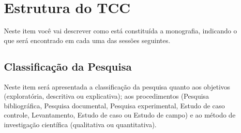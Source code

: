 \section{Estrutura do TCC}
Neste item você vai descrever como está constituída a monografia, indicando o
que será encontrado em cada uma das sessões seguintes.

\subsection{Classificação da Pesquisa}
Neste item será apresentada a classificação da pesquisa quanto aos objetivos
(exploratória, descritiva ou explicativa); aos procedimentos (Pesquisa
bibliográfica, Pesquisa documental, Pesquisa experimental, Estudo de caso
controle, Levantamento, Estudo de caso ou Estudo de campo) e ao método de
investigação científica (qualitativa ou quantitativa).
